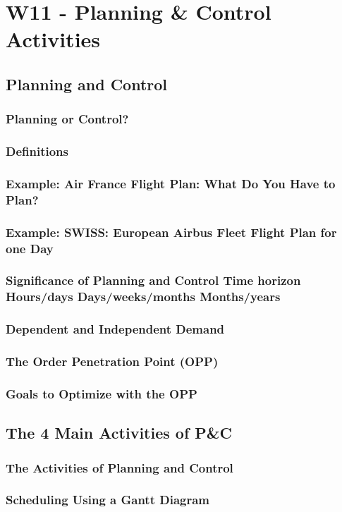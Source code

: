 \section{W11 - Planning \& Control Activities}
\subsection{Planning and Control}
\subsubsection{Planning or Control?}
\subsubsection{Definitions}
\subsubsection{Example: Air France Flight Plan: What Do You Have to Plan?}
\subsubsection{Example: SWISS: European Airbus Fleet Flight Plan for one Day }
\subsubsection{Significance of Planning and Control Time horizon Hours/days Days/weeks/months Months/years}
\subsubsection{Dependent and Independent Demand }
\subsubsection{The Order Penetration Point (OPP)}
\subsubsection{Goals to Optimize with the OPP}
\subsection{The 4 Main Activities of P\&C}
\subsubsection{The Activities of Planning and Control}
\subsubsection{Scheduling Using a Gantt Diagram}

